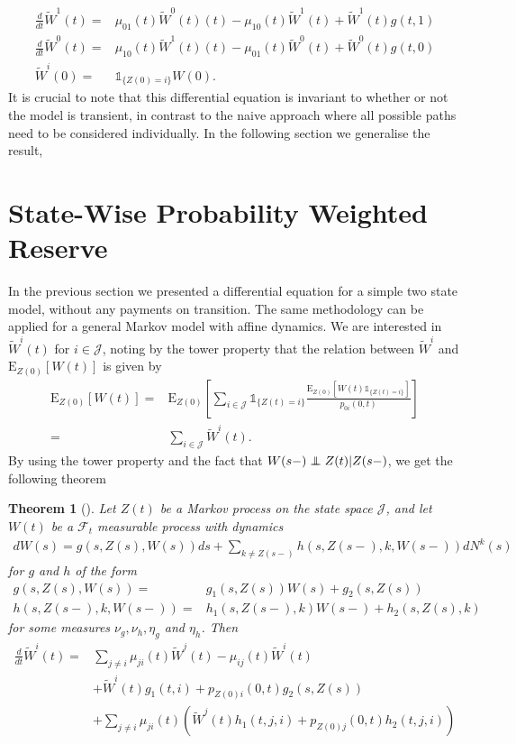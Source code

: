 \documentclass[12pt]{article}
\newcommand{\E}{\text{E}}
\newcommand{\indic}[1]{\mathds{1}_{ \{ #1 \} }}
\newcommand\independent{\protect\mathpalette{\protect\independenT}{\perp}}
\def\independenT#1#2{\mathrel{\rlap{$#1#2$}\mkern2mu{#1#2}}}
\theoremstyle{my_thm}
\newtheorem{thm}{Theorem}[section]
\begin{document}
\begin{align*}
\frac{d}{dt} \tilde{W}^1(t)=& \mu_{01}(t)\tilde{W}^0(t)(t)-\mu_{10}(t)\tilde{W}^1(t)
+ \tilde{W}^1(t)g(t,1)
\\
\frac{d}{dt} \tilde{W}^0(t)=& \mu_{10}(t)\tilde{W}^1(t)(t)-\mu_{01}(t)\tilde{W}^0(t)
+ \tilde{W}^0(t)g(t,0)
\\
\tilde{W}^i(0)=&\indic{Z(0)=i}W(0).
\end{align*}
It is crucial to note that this differential equation is invariant to whether or not the model is transient, in contrast to the naive approach where all possible paths need to be considered individually. In the following section we generalise the result, 

\section{State-Wise Probability Weighted Reserve}
In the previous section we presented a differential equation for a simple two state model, without any payments on transition. The same methodology can be applied for a general Markov model with affine dynamics. We are interested in $\tilde{W}^i(t)$ for $i \in \mathcal{J}$, noting by the tower property that the relation between $\tilde{W}^i$ and $\E_{Z(0)}[W(t)]$ is given by
\begin{align*}
\E_{Z(0)}[W(t)] =&
\E_{Z(0)} \left[ \sum_{i\in \mathcal{J}} \indic{Z(t)=i} \frac{\E_{Z(0)}[W(t)\indic{Z(t)=i}]}{p_{0i}(0,t)} \right]
\\
=&
\sum_{i\in \mathcal{J}} \tilde{W}^i(t).
\end{align*}
By using the tower property and the fact that $W(s-)\independent Z(t)|Z(s-)$, we get the following theorem
\begin{thm}[]
\label{thm:Diff_1}
Let $Z(t)$ be a Markov process on the state space $\mathcal{J}$, and let $W(t)$ be a $\mathcal{F}_t$ measurable process with dynamics
\begin{align*}
dW(s)=  g(s,Z(s),W(s))ds+
 \sum_{k \neq Z(s-)} h(s,Z(s-),k,W(s-)) dN^k(s) 
\end{align*}
for $g$ and $h$ of the form
\begin{align*}
g(s,Z(s),W(s))=&g_1(s,Z(s)) W(s)+g_2(s,Z(s))
\\
h(s,Z(s-),k,W(s-))=&h_1(s,Z(s-),k) W(s-)+h_2(s,Z(s),k)
\end{align*}
for some measures $\nu_g,\nu_h,\eta_g$ and $\eta_h$.
Then
\begin{align*}
\frac{d}{dt}\tilde{W}^i(t)=&
\sum_{j \neq i} \mu_{ji}(t) \tilde{W}^j(t)-\mu_{ij}(t)\tilde{W}^i(t)
\\
&+
\tilde{W}^i(t)g_1(t,i)+p_{Z(0)i}(0,t)g_2(s,Z(s))
\\
&+
\sum_{j\neq i} \mu_{ji}(t) \left( \tilde{W}^j(t) h_1(t,j,i)+ p_{Z(0)j}(0,t)h_2(t,j,i)\right)
\end{align*}
\end{thm}
\end{document}
